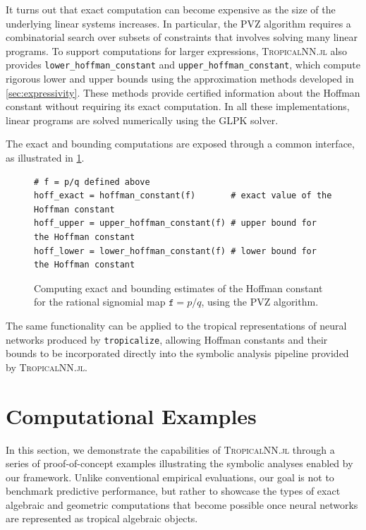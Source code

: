 \documentclass[10pt]{article}
\theoremstyle{definition}
\theoremstyle{remark}
\begin{document}
It turns out that exact computation can become expensive as the size of the underlying linear systems increases. In particular, the PVZ algorithm requires a combinatorial search over subsets of constraints that involves solving many linear programs. To support computations for larger expressions, \textsc{TropicalNN.jl} also provides \texttt{lower\_hoffman\_constant} and \texttt{upper\_hoffman\_constant}, which compute rigorous lower and upper bounds using the approximation methods developed in
\cref{sec:expressivity}. These methods provide certified information about the Hoffman constant
without requiring its exact computation. In all these implementations, linear programs are solved numerically using the GLPK solver.

The exact and bounding computations are exposed through a common
interface, as illustrated in \cref{fig:hoffman}.

\begin{figure}[H]
\begin{lstlisting}
# f = p/q defined above
hoff_exact = hoffman_constant(f)       # exact value of the Hoffman constant
hoff_upper = upper_hoffman_constant(f) # upper bound for the Hoffman constant
hoff_lower = lower_hoffman_constant(f) # lower bound for the Hoffman constant
\end{lstlisting}
\caption{Computing exact and bounding estimates of the Hoffman constant for the rational signomial map $\mathtt{f} = p/q$, using the PVZ algorithm.}
\label{fig:hoffman}
\end{figure}

The same functionality can be applied to the tropical representations of neural networks produced by \texttt{tropicalize}, allowing Hoffman constants and their bounds to be incorporated directly into the symbolic analysis pipeline provided by \textsc{TropicalNN.jl}.


\section{Computational Examples} \label{sec:experiments}

In this section, we demonstrate the capabilities of \textsc{TropicalNN.jl} through a series of proof-of-concept examples illustrating the symbolic analyses enabled by our framework. Unlike conventional empirical evaluations, our goal is not to benchmark predictive performance, but rather to showcase the types of exact algebraic and geometric computations that become possible once neural networks are represented as tropical algebraic objects.
\end{document}
